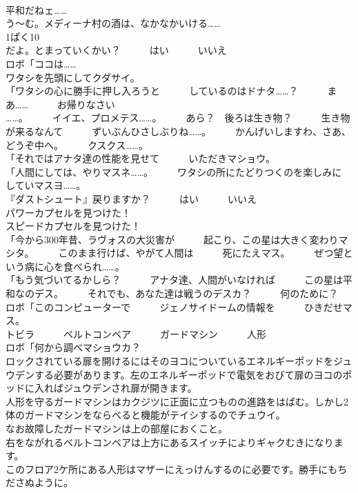 \documentclass[8pt]{extreport}
\begin{document}
\begin{CJK}{UTF8}{min}
\\	平和だねェ……	
\\	う～む。メディーナ村の酒は、なかなかいける……	
\\	1ぱく10
\\	だよ。とまっていくかい？　　　はい　　　いいえ	
\\	ロボ「ココは……	
\\	ワタシを先頭にしてクダサイ。	
\\	「ワタシの心に勝手に押し入ろうと　　　しているのはドナタ……？　　　まあ……　　　お帰りなさい
\\	……。　　　イイエ、プロメテス……。　　　あら？　後ろは生き物？　　　生き物が来るなんて　　　ずいぶんひさしぶりね……。　　　かんげいしますわ、さあ、どうぞ中へ。　　　クスクス……。	
\\	「それではアナタ達の性能を見せて　　　いただきマショウ。	
\\	「人間にしては、やりマスネ……。　　　ワタシの所にたどりつくのを楽しみに　　　していマスヨ……。	
\\	『ダストシュート』戻りますか？　　　はい　　　いいえ	
\\	パワーカプセルを見つけた！	
\\	スピードカプセルを見つけた！	
\\	「今から300年昔、ラヴォスの大災害が　　　起こり、この星は大きく変わりマシタ。　　　このまま行けば、やがて人間は　　　死にたえマス。　　　ぜつ望という病に心を食べられ……。	
\\	「もう気づいてるかしら？　　　アナタ達、人間がいなければ　　　この星は平和なのデス。　　　それでも、あなた達は戦うのデスカ？　　　何のために？	
\\	ロボ「このコンピューターで　　　ジェノサイドームの情報を　　　ひきだせマス。	
\\	トビラ　　　ベルトコンベア　　　ガードマシン　　　人形	
\\	ロボ「何から調べマショウカ？	
\\	ロックされている扉を開けるにはそのヨコについているエネルギーポッドをジュウデンする必要があります。左のエネルギーポッドで電気をおびて扉のヨコのポッドに入ればジュウデンされ扉が開きます。	
\\	人形を守るガードマシンはカクジツに正面に立つものの進路をはばむ。しかし2体のガードマシンをならべると機能がテイシするのでチュウイ。	
\\	なお故障したガードマシンは上の部屋におくこと。	
\\	右をながれるベルトコンベアは上方にあるスイッチによりギャクむきになります。	
\\	このフロア2ケ所にある人形はマザーにえっけんするのに必要です。勝手にもちださぬように。	

\end{CJK}
\end{document}
